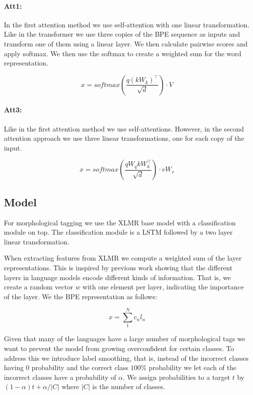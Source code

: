 \documentclass[11pt]{article}
\begin{document}
	\paragraph{Att1:} In the first attention method we use self-attention \citep{vaswani2017attention} with one linear transformation. Like in the transformer we use three copies of the BPE sequence as inputs and transform one of them using a linear layer.
	We then calculate pairwise scores and apply softmax. We then use the softmax to create a weighted sum for the word representation.
	
	\begin{equation}
	    x = softmax(\frac{q (kW_k)^\intercal}{\sqrt{d}}) \cdot V
	\end{equation}
	
	\paragraph{Att3:} Like in the first attention method we use self-attentions. However, in the second attention approach we use three linear transformations, one for each copy of the input. 
	
	\begin{equation}
	    x = softmax(\frac{qW_q kW_k ^\intercal}{\sqrt{d}}) \cdot vW_v
	\end{equation}
	
	\subsection{Model}
	For morphological tagging we use the XLMR base model with a classification module on top. The classification module is a LSTM followed by a two layer linear transformation. 
	
	When extracting features from XLMR we compute a weighted sum of the layer representations. This is inspired by previous work showing that the different layers in language models encode different kinds of information. That is, we create a random vector $w$ with one element per layer, indicating the importance of the layer. We the BPE representation as follows:
	
	\begin{equation}
		x = \sum_{1}^{N} c_n l_n
	\end{equation}
	
	Given that many of the languages have a large number of morphological tags we want to prevent the model from growing overconfident for certain classes. To address this we introduce label smoothing, that is, instead of the incorrect classes having 0 probability and the correct class $100\%$ probability we let each of the incorrect classes have a probability of $\alpha$. We assign probabilities to a target $t$ by $(1-\alpha)t + \alpha / |C|$ where $|C|$ is the number of classes. 
	
\end{document}
